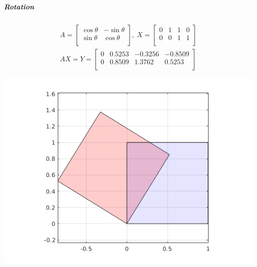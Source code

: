 \documentclass[MathsNotesBase.tex]{subfiles}
\begin{document}
{		\subparagraph{Rotation}
		\begin{align*}
		A =
		\begin{bmatrix}    
		\cos{\theta}  &  -\sin{\theta} \\
		\sin{\theta}  &  \cos{\theta} \\		
		\end{bmatrix}
		,\; X = 
		\begin{bmatrix}  
		0   &  1  &   1  &   0 \\
		0   &  0  &   1  &   1	\\	
		\end{bmatrix} \\[10pt]
		AX = Y = 
		\begin{bmatrix}   
		0  &   0.5253  &  -0.3256  &  -0.8509 \\
		0  &   0.8509  &   1.3762  &   0.5253	\\
		\end{bmatrix}
		\end{align*}
	
		\begin{center}
		\includegraphics[scale=0.85]{resources/img/GeometryOfMatrices_images/rotation.png}
		\end{center}
		
}
\end{document}

